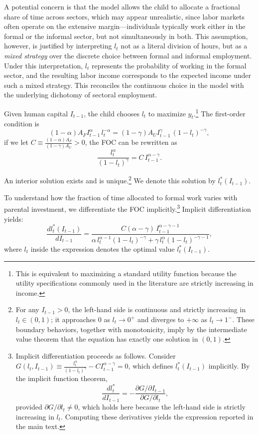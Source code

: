 \documentclass[12pt]{article}
\begin{document}
A potential concern is that the model allows the child to allocate a fractional share of time across sectors, which may appear unrealistic, since labor markets often operate on the extensive margin—individuals typically work either in the formal or the informal sector, but not simultaneously in both. This assumption, however, is justified by interpreting $l_t$ not as a literal division of hours, but as a \emph{mixed strategy} over the discrete choice between formal and informal employment. Under this interpretation, $l_t$ represents the probability of working in the formal sector, and the resulting labor income corresponds to the expected income under such a mixed strategy. This reconciles the continuous choice in the model with the underlying dichotomy of sectoral employment.


\medskip

\noindent

Given human capital $I_{t-1}$, the child chooses $l_t$ to maximize $y_t$.\footnote{This is equivalent to maximizing a standard utility function because the utility specifications commonly used in the literature are strictly increasing in income.} 
The first-order condition is
\begin{equation}
(1-\alpha)A_F I_{t-1}^\alpha\, l_t^{-\alpha}
=
(1-\gamma)A_U I_{t-1}^\gamma\, (1-l_t)^{-\gamma},
\label{eq:foc_l}
\end{equation}
if we let $C \equiv \frac{(1-\alpha)A_F}{(1-\gamma)A_U}>0$, the FOC can be rewritten as
\[
\frac{l_t^\alpha}{(1-l_t)^\gamma}
=
C\, I_{t-1}^{\alpha-\gamma}.
\]

An interior solution exists and is unique.\footnote{For any $I_{t-1}>0$, the left-hand side is continuous and strictly increasing in $l_t\in(0,1)$; it approaches $0$ as $l_t\to 0^+$ and diverges to $+\infty$ as $l_t\to 1^-$. These boundary behaviors, together with monotonicity, imply by the intermediate value theorem that the equation has exactly one solution in $(0,1)$.} 
We denote this solution by $l_t^*(I_{t-1})$.


To understand how the fraction of time allocated to formal work varies with parental investment, we differentiate the FOC implicitly.\footnote{Implicit differentiation proceeds as follows. Consider $G(l_t,I_{t-1}) \equiv \frac{l_t^\alpha}{(1-l_t)^\gamma} - C I_{t-1}^{\alpha-\gamma} = 0$,
which defines $l_t^*(I_{t-1})$ implicitly. By the implicit function theorem,  
\[
\frac{dl_t^*}{dI_{t-1}}
= -\frac{\partial G/\partial I_{t-1}}{\partial G/\partial l_t},
\]
provided $\partial G/\partial l_t\neq 0$, which holds here because the left-hand side is strictly increasing in $l_t$. Computing these derivatives yields the expression reported in the main text.}  
Implicit differentiation yields:
\[
\frac{d l_t^*(I_{t-1})}{d I_{t-1}}
=
\frac{
C(\alpha-\gamma)\,I_{t-1}^{\alpha-\gamma-1}
}{
\alpha\,l_t^{\alpha-1}(1-l_t)^{-\gamma}
+
\gamma\,l_t^\alpha(1-l_t)^{-\gamma-1}
},
\]
where \(l_t\) inside the expression denotes the optimal value \(l_t^*(I_{t-1})\).
\end{document}
